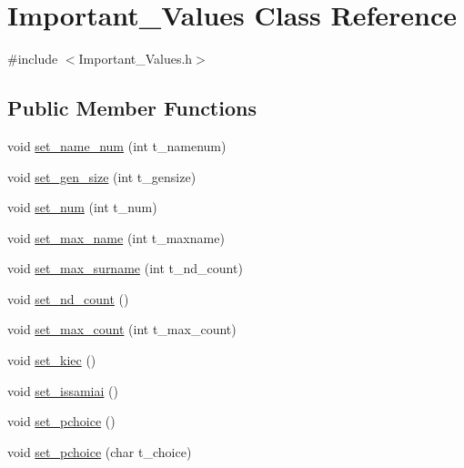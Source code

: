\hypertarget{class_important___values}{}\section{Important\+\_\+\+Values Class Reference}
\label{class_important___values}


{\ttfamily \#include $<$Important\+\_\+\+Values.\+h$>$}

\subsection*{Public Member Functions}
\begin{DoxyCompactItemize}
\item 
void \mbox{\hyperlink{class_important___values_a1f18a39c5d24a7f2d581f7d452425ef0}{set\+\_\+name\+\_\+num}} (int t\+\_\+namenum)
\item 
void \mbox{\hyperlink{class_important___values_aef6d6a9cd333cce492a244df5aa6cdf9}{set\+\_\+gen\+\_\+size}} (int t\+\_\+gensize)
\item 
void \mbox{\hyperlink{class_important___values_ab9c05e7bed46d38efd119f644e2fcffd}{set\+\_\+num}} (int t\+\_\+num)
\item 
void \mbox{\hyperlink{class_important___values_a64749e36f56461d36fc441ba023e5278}{set\+\_\+max\+\_\+name}} (int t\+\_\+maxname)
\item 
void \mbox{\hyperlink{class_important___values_a45e78ac2787fede19eb0d9c2886edb40}{set\+\_\+max\+\_\+surname}} (int t\+\_\+nd\+\_\+count)
\item 
void \mbox{\hyperlink{class_important___values_a30fac9191f1c5ff937ef30b1ec227d79}{set\+\_\+nd\+\_\+count}} ()
\item 
void \mbox{\hyperlink{class_important___values_a864e30dca6b4853122871636b3f8e720}{set\+\_\+max\+\_\+count}} (int t\+\_\+max\+\_\+count)
\item 
void \mbox{\hyperlink{class_important___values_a2e4e4a78f8f95954f54f3c6f9d1e887b}{set\+\_\+kiec}} ()
\item 
void \mbox{\hyperlink{class_important___values_a800b5715cde55bd471df46690be34839}{set\+\_\+issamiai}} ()
\item 
void \mbox{\hyperlink{class_important___values_a6c6d4f85b3e59b527ae5376236dd117a}{set\+\_\+pchoice}} ()
\item 
void \mbox{\hyperlink{class_important___values_a0fe5f87794f90561d02374918f19adb6}{set\+\_\+pchoice}} (char t\+\_\+choice)
\item 

\end{DoxyCompactItemize}
